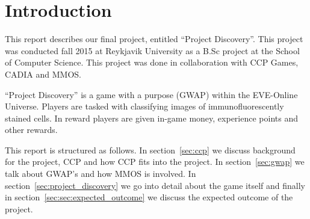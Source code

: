 \section{Introduction}\label{sec:introduction}
This report describes our final project, entitled ``Project Discovery''. This
project was conducted fall 2015 at Reykjavik University as a B.Sc project at
the School of Computer Science. This project was done in collaboration with CCP
Games, CADIA and MMOS.

``Project Discovery'' is a game with a purpose (GWAP) within the EVE-Online
Universe. Players are tasked with classifying images of immunofluorescently
stained cells. In reward players are given in-game money, experience points and
other rewards.

This report is structured as follows. In section~\ref{sec:ccp} we discuss background 
for the project, CCP and how CCP fits into the project. In section~\ref{sec:gwap} we talk about GWAP's and how MMOS is involved. In section~\ref{sec:project_discovery} we go into detail about the game itself and finally in section~\ref{sec:sec:expected_outcome} we discuss the expected outcome of the project.

